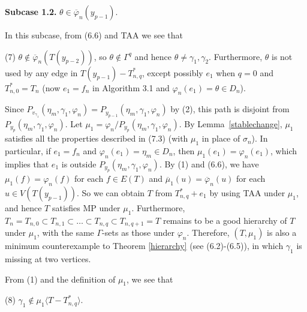 \documentclass[11pt]{article}
\newcommand{\phibar}{\overline{\varphi}}
\begin{document}
{\bf Subcase 1.2.} $\theta \in\overline{\varphi}_n(y_{p-1})$. 

In this subcase, from (6.6) and TAA we see that

(7) $\theta \notin \overline{\varphi}_n(T(y_{p-2}))$, so $\theta \notin \Gamma^q$ and hence $\theta\ne \gamma_1, \gamma_2$.
Furthermore, $\theta$ is not used by any edge in $T(y_{p-1}) -  T_{n,q}^*$, except possibly $e_1$ when $q=0$ and $T_{n,0}^*=T_n$ 
(now $e_1=f_n$ in Algorithm 3.1 and $\varphi_n(e_1)=\theta \in D_n$). 

Since $P_{v_{\gamma_1}}(\eta_m, \gamma_{1},\varphi_n)=P_{y_{p-1}}(\eta_m,\gamma_{1},\varphi_n)$ by (2), this
path is disjoint from $P_{y_{p}}(\eta_m,\gamma_{1},\varphi_n)$. Let $\mu_1 = \varphi_n/P_{y_{p}}(\eta_m,\gamma_1,\varphi_n)$.
By Lemma~\ref{stablechange},  $\mu_1$ satisfies all the properties described in (7.3) (with $\mu_1$ in place of
$\sigma_n$). In particular, if $e_1=f_n$ and $\varphi_n(e_1)=\eta_m \in D_n$, then $\mu_1(e_1)=\varphi_n(e_1)$, which 
implies that $e_1$ is outside $P_{y_{p}}(\eta_m,\gamma_1,\varphi_n)$.
By (1) and (6.6), we have $\mu_1(f)=\varphi_n(f)$ for each $f\in E(T)$ and $\overline{\mu}_1(u)=\phibar_n(u)$ 
for each $u\in V(T(y_{p-1}))$. So we can obtain $T$ from $T_{n,q}^*+e_1$ by using TAA under $\mu_1$, and hence $T$ satisfies 
MP under $\mu_1$. Furthermore, $T_n=T_{n,0} \subset T_{n,1} \subset \ldots \subset T_{n,q} \subset T_{n,q+1}=T$ 
remains to be a good hierarchy of $T$ under $\mu_1$, with the same $\Gamma$-sets as those under $\varphi_n$.
Therefore, $(T, \mu_1)$ is also a minimum counterexample to Theorem \ref{hierarchy} (see (6.2)-(6.5)), in which $\gamma_1$ is missing at two vertices.

From (1) and the definition of $\mu_1$, we see that

(8) $\gamma_1 \notin \mu_1 \langle T - T_{n,q}^* \rangle$. 
\end{document}
